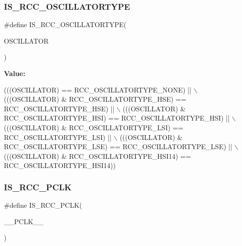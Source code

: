 \subsubsection{\texorpdfstring{I\+S\+\_\+\+R\+C\+C\+\_\+\+O\+S\+C\+I\+L\+L\+A\+T\+O\+R\+T\+Y\+PE}{IS\_RCC\_OSCILLATORTYPE}}
{\footnotesize\ttfamily \#define I\+S\+\_\+\+R\+C\+C\+\_\+\+O\+S\+C\+I\+L\+L\+A\+T\+O\+R\+T\+Y\+PE(\begin{DoxyParamCaption}\item[{}]{O\+S\+C\+I\+L\+L\+A\+T\+OR }\end{DoxyParamCaption})}

{\bfseries Value\+:}
\begin{DoxyCode}
(((OSCILLATOR) == RCC\_OSCILLATORTYPE\_NONE)                               || \(\backslash\)
                                           (((OSCILLATOR) & RCC\_OSCILLATORTYPE\_HSE) == 
      RCC\_OSCILLATORTYPE\_HSE)     || \(\backslash\)
                                           (((OSCILLATOR) & RCC\_OSCILLATORTYPE\_HSI) == 
      RCC\_OSCILLATORTYPE\_HSI)     || \(\backslash\)
                                           (((OSCILLATOR) & RCC\_OSCILLATORTYPE\_LSI) == 
      RCC\_OSCILLATORTYPE\_LSI)     || \(\backslash\)
                                           (((OSCILLATOR) & RCC\_OSCILLATORTYPE\_LSE) == 
      RCC\_OSCILLATORTYPE\_LSE)     || \(\backslash\)
                                           (((OSCILLATOR) & RCC\_OSCILLATORTYPE\_HSI14) == 
      RCC\_OSCILLATORTYPE\_HSI14))
\end{DoxyCode}
\mbox{\label{group___r_c_c___private___macros_ga378b8fcc2e64326f6f98b30cb3fc22d9}} 
\subsubsection{\texorpdfstring{I\+S\+\_\+\+R\+C\+C\+\_\+\+P\+C\+LK}{IS\_RCC\_PCLK}}
{\footnotesize\ttfamily \#define I\+S\+\_\+\+R\+C\+C\+\_\+\+P\+C\+LK(\begin{DoxyParamCaption}\item[{}]{\+\_\+\+\_\+\+P\+C\+L\+K\+\_\+\+\_\+ }\end{DoxyParamCaption})}

